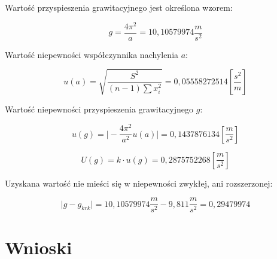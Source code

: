 \documentclass[a4paper,10pt,twoside]{article}
\begin{document}
Wartość przyspieszenia grawitacyjnego jest określona wzorem:

$$ g = \frac{4 \pi^2}{a} = 10,10579974 \frac{m}{s^2} $$

Wartość niepewności współczynnika nachylenia $a$:

$$ u(a) = \sqrt{ \frac{S^2}{(n - 1)\sum x_i^2} } = 0,05558272514 [\frac{s^2}{m}]$$

Wartość niepewności przyspieszenia grawitacyjnego $g$:

$$ u(g) = \vert - \frac{4 \pi^2}{a^2} u(a) \vert = 0,1437876134 [\frac{m}{s^2}]$$

$$ U(g) = k \cdot u(g) = 0,2875752268 [\frac{m}{s^2}]$$

Uzyskana wartość nie mieści się w niepewności zwykłej, ani rozszerzonej:

$$ \vert g - g_{krk} \vert = 10,10579974 \frac{m}{s^2} - 9,811 \frac{m}{s^2} = 0,29479974 $$

\section{Wnioski}
\end{document}
